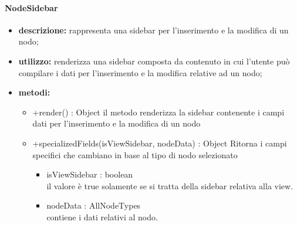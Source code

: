 \paragraph{NodeSidebar}
\begin{itemize}
	\item \textbf{descrizione:} rappresenta una sidebar per l'inserimento e la modifica di un nodo;
	\item \textbf{utilizzo:} renderizza una sidebar composta da contenuto in cui l'utente può compilare i dati per l'inserimento e la modifica relative ad un nodo;
	\item \textbf{metodi:}
	\begin{itemize}
		\item +render() : Object\newline
		il metodo renderizza la sidebar  contenente i campi dati per l'inserimento e la modifica di un nodo
		
		\item +specializedFields(isViewSidebar, nodeData) : Object\newline
		Ritorna i campi specifici che cambiano in base al tipo di nodo selezionato
		\begin{itemize}
			\item isViewSidebar : boolean\\
			il valore è true solamente se si tratta della sidebar relativa alla view.
			\item nodeData : AllNodeTypes\\
			contiene i dati relativi al nodo.
		\end{itemize}
	\end{itemize}
\end{itemize}
